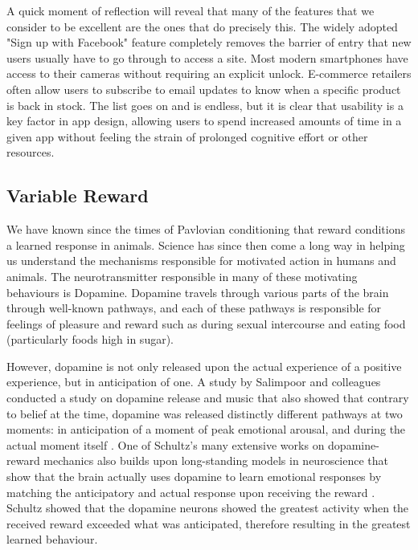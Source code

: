 A quick moment of reflection will reveal that many of the features that we consider to be excellent are the ones that do precisely this. The widely adopted "Sign up with Facebook" feature completely removes the barrier of entry that new users usually have to go through to access a site. Most modern smartphones have access to their cameras without requiring an explicit unlock. E-commerce retailers often allow users to subscribe to email updates to know when a specific product is back in stock. The list goes on and is endless, but it is clear that usability is a key factor in app design, allowing users to spend increased amounts of time in a given app without feeling the strain of prolonged cognitive effort or other resources.

\subsection{Variable Reward}
We have known since the times of Pavlovian conditioning that reward conditions a learned response in animals. Science has since then come a long way in helping us understand the mechanisms responsible for motivated action in humans and animals. The neurotransmitter responsible in many of these motivating behaviours is Dopamine. Dopamine travels through various parts of the brain through well-known pathways, and each of these pathways is responsible for feelings of pleasure and reward such as during sexual intercourse and eating food (particularly foods high in sugar).

However, dopamine is not only released upon the actual experience of a positive experience, but in anticipation of one. A study by Salimpoor and colleagues conducted a study on dopamine release and music that also showed that contrary to belief at the time, dopamine was released distinctly different pathways at two moments: in anticipation of a moment of peak emotional arousal, and during the actual moment itself \cite{salimpoor2011anatomically}. One of Schultz's many extensive works on dopamine-reward mechanics also builds upon long-standing models in neuroscience that show that the brain actually uses dopamine to learn emotional responses by matching the anticipatory and actual response upon receiving the reward \cite{schultz2016dopamine}. Schultz showed that the dopamine neurons showed the greatest activity when the received reward exceeded what was anticipated, therefore resulting in the greatest learned behaviour.

